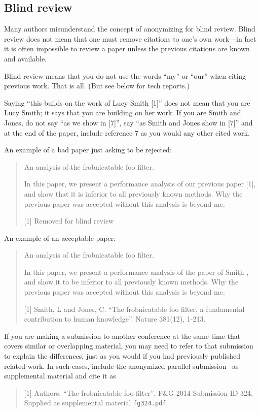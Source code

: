 \subsection{Blind review}

Many authors misunderstand the concept of anonymizing for blind review.
Blind review does not mean that one must remove citations to one's own work---in fact it is often impossible to review a paper unless the previous citations are known and available.

Blind review means that you do not use the words ``my'' or ``our'' when citing previous work.
That is all.
(But see below for tech reports.)

Saying ``this builds on the work of Lucy Smith [1]'' does not mean that you are Lucy Smith;
it says that you are building on her work.
If you are Smith and Jones, do not say ``as we show in [7]'', say ``as Smith and Jones show in [7]'' and at the end of the paper, include reference 7 as you would any other cited work.

An example of a bad paper just asking to be rejected:
\begin{quote}
\begin{center}
    An analysis of the frobnicatable foo filter.
\end{center}

   In this paper, we present a performance analysis of our previous paper [1], and show that it is inferior to all previously known methods.
   Why the previous paper was accepted without this analysis is beyond me.

   [1] Removed for blind review
\end{quote}


An example of an acceptable paper:
\begin{quote}
\begin{center}
     An analysis of the frobnicatable foo filter.
\end{center}

   In this paper, we present a performance analysis of the paper of Smith \etal [1], and show it to be inferior to all previously known methods.
   Why the previous paper was accepted without this analysis is beyond me.

   [1] Smith, L and Jones, C. ``The frobnicatable foo filter, a fundamental contribution to human knowledge''. Nature 381(12), 1-213.
\end{quote}

If you are making a submission to another conference at the same time that covers similar or overlapping material, you may need to refer to that submission to explain the differences, just as you would if you had previously published related work.
In such cases, include the anonymized parallel submission~\cite{Authors14} as supplemental material and cite it as
\begin{quote}
[1] Authors. ``The frobnicatable foo filter'', F\&G 2014 Submission ID 324, Supplied as supplemental material {\tt fg324.pdf}.
\end{quote}

